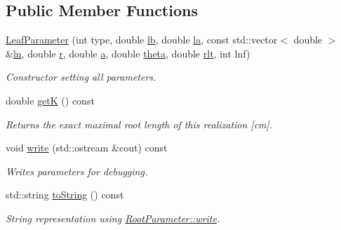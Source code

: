 \subsection*{Public Member Functions}
\begin{DoxyCompactItemize}
\item 
\mbox{\label{classCPlantBox_1_1LeafParameter_afcf5e061df816b74198539e2dd22ec8f}} 
\hyperlink{classCPlantBox_1_1LeafParameter_afcf5e061df816b74198539e2dd22ec8f}{Leaf\+Parameter} (int type, double \hyperlink{classCPlantBox_1_1LeafParameter_a9e7f83b4d00f065f57828a0095760d99}{lb}, double \hyperlink{classCPlantBox_1_1LeafParameter_ac47a1d37fbe865651caadea39a6f7e2c}{la}, const std\+::vector$<$ double $>$ \&\hyperlink{classCPlantBox_1_1LeafParameter_aeafebf5e63919a27d47f31dc09afddc8}{ln}, double \hyperlink{classCPlantBox_1_1LeafParameter_ab3a0d010eb7f48c4c65bcb4ff89f90e9}{r}, double \hyperlink{classCPlantBox_1_1LeafParameter_a7054dac50e123c9b8f131dc44b986e07}{a}, double \hyperlink{classCPlantBox_1_1LeafParameter_a05e81f99fb9363caca8b382b0dc021ca}{theta}, double \hyperlink{classCPlantBox_1_1LeafParameter_afece895e2e0669022f3813e9bd4263c6}{rlt}, int lnf)
\begin{DoxyCompactList}\small\item\em Constructor setting all parameters. \end{DoxyCompactList}\item 
double \hyperlink{classCPlantBox_1_1LeafParameter_a5a14e0f70c9e00cdcafd4fb86b6ef0ca}{getK} () const
\begin{DoxyCompactList}\small\item\em Returns the exact maximal root length of this realization \mbox{[}cm\mbox{]}. \end{DoxyCompactList}\item 
\mbox{\label{classCPlantBox_1_1LeafParameter_aff7069a9fef9bd5a2edabd59b237c2d4}} 
void \hyperlink{classCPlantBox_1_1LeafParameter_aff7069a9fef9bd5a2edabd59b237c2d4}{write} (std\+::ostream \&cout) const
\begin{DoxyCompactList}\small\item\em Writes parameters for debugging. \end{DoxyCompactList}\item 
\mbox{\label{classCPlantBox_1_1LeafParameter_ac6f780e3619f958dde05dc1871ce4faa}} 
std\+::string \hyperlink{classCPlantBox_1_1LeafParameter_ac6f780e3619f958dde05dc1871ce4faa}{to\+String} () const
\begin{DoxyCompactList}\small\item\em String representation using \hyperlink{classCPlantBox_1_1RootParameter_aed958341f67d2bb36e1480e531732535}{Root\+Parameter\+::write}. \end{DoxyCompactList}\end{DoxyCompactItemize}
